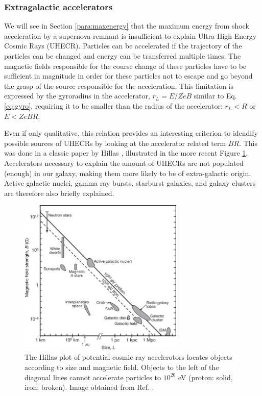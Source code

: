 \subsubsection{Extragalactic accelerators}
We will see in Section \ref{para:maxenergy} that the maximum energy from shock acceleration by a supernova remnant is insufficient to explain Ultra High Energy Cosmic Rays (UHECR). Particles can be accelerated if the trajectory of the particles can be changed and energy can be transferred multiple times. The magnetic fields responsible for the course change of these particles have to be sufficient in magnitude in order for these particles not to escape and go beyond the grasp of the source responsible for the acceleration. This limitation is expressed by the gyroradius in the accelerator, $r_L = E/ZeB$ similar to Eq. \ref{eq:gyro}, requiring it to be smaller than the radius of the accelerator: $r_L < R$ or $E < ZeBR$.

Even if only qualitative, this relation provides an interesting criterion to idendify possible sources of UHECRs by looking at the accelerator related term $BR$. This was done in a classic paper by Hillas \cite{Hillas:1985is}, illustrated in the more recent Figure \ref{fig:hillas}. Accelerators necessary to explain the amount of UHECRs are not populated (enough) in our galaxy, making them more likely to be of extra-galactic origin. Active galactic nuclei, gamma ray bursts, starburst galaxies, and galaxy clusters are therefore also briefly explained.

\begin{figure}
\centering
\includegraphics[width = 0.7\textwidth]{chapter3/img/Hillas.jpg}
\caption{The Hillas plot of potential cosmic ray accelerotors locates objects according to size and magnetic field. Objects to the left of the diagonal lines cannot accelerate particles to $10^{20}$ eV (proton: solid, iron: broken). Image obtained from Ref. \cite{Bauleo:2009zz}.}
\label{fig:hillas}
\end{figure}




